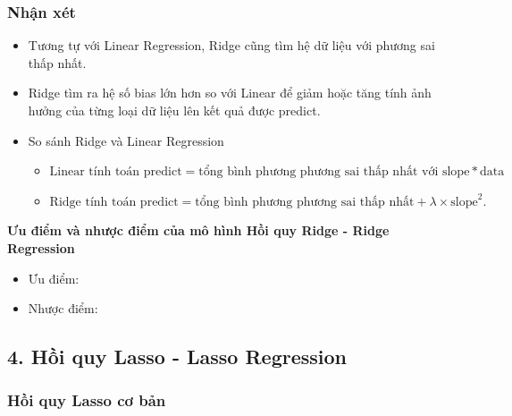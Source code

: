 \documentclass{article}
\begin{document}
	\subsubsection{Nhận xét}
	\begin{itemize}
		\item Tương tự với Linear Regression, Ridge cũng tìm hệ dữ liệu với phương sai thấp nhất.
		
		\item Ridge tìm ra hệ số bias lớn hơn so với Linear để giảm hoặc tăng tính ảnh hưởng của từng loại dữ liệu lên kết quả được predict.
		\item So sánh Ridge và Linear Regression
		\begin{itemize}
			\item $\text{Linear tính toán predict} = \text{tổng bình phương phương sai thấp nhất với slope} * \text{data}$
			\item $\text{Ridge tính toán predict} = \text{tổng bình phương phương sai thấp nhất} + \lambda \times \text{slope}^2.$
		\end{itemize}
	\end{itemize}
	\textbf{Ưu điểm và nhược điểm của mô hình Hồi quy Ridge - Ridge Regression}
	\begin{itemize}
		\item Ưu điểm:
		\item Nhược điểm:
	\end{itemize}
	\subsection{4. Hồi quy Lasso - Lasso Regression}
	\subsubsection{Hồi quy Lasso cơ bản}
\end{document}
